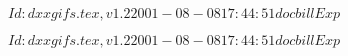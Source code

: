 \documentclass{article}
\begin{document}
$Id: dxxgifs.tex,v 1.2 2001-08-08 17:44:51 docbill Exp $


\pagebreak


$Id: dxxgifs.tex,v 1.2 2001-08-08 17:44:51 docbill Exp $


\pagebreak
\end{document}
